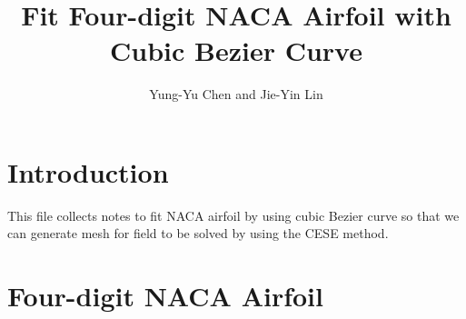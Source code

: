 \documentclass{turgon}
\title{
%
Fit Four-digit NACA Airfoil with Cubic Bezier Curve
%
}
\author{
%
Yung-Yu Chen and Jie-Yin Lin
%
}
\begin{document}
\maketitle

\tableofcontents

\chapter*{Introduction}

This file collects notes to fit NACA airfoil by using cubic Bezier curve so
that we can generate mesh for field to be solved by using the CESE
method\cite{chang_method_1995}.

\chapter{Four-digit NACA Airfoil}

\end{document}
